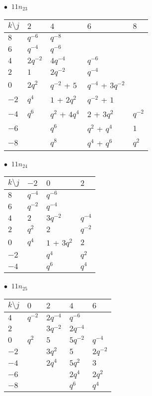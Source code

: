 %
\begin{minipage}{\linewidth}
$\bullet\ $ $11n_{23}$ \vspace{0.5em} \\
\begin{tabular}{l|llll}
$k \setminus j$ & $2$ & $4$ & $6$ & $8$ \\
\hline
$8$ & $q^{-6}$ & $q^{-8}$ &  &  \\
$6$ & $q^{-4}$ & $q^{-6}$ &  &  \\
$4$ & $2q^{-2}$ & $4q^{-4}$ & $q^{-6}$ &  \\
$2$ & $1$ & $2q^{-2}$ & $q^{-4}$ &  \\
$0$ & $2q^{2}$ & $q^{-2}$ + $5$ & $q^{-4}$ + $3q^{-2}$ &  \\
$-2$ & $q^{4}$ & $1$ + $2q^{2}$ & $q^{-2}$ + $1$ &  \\
$-4$ & $q^{6}$ & $q^{2}$ + $4q^{4}$ & $2$ + $3q^{2}$ & $q^{-2}$ \\
$-6$ &  & $q^{6}$ & $q^{2}$ + $q^{4}$ & $1$ \\
$-8$ &  & $q^{8}$ & $q^{4}$ + $q^{6}$ & $q^{2}$ \\
\end{tabular}
\vspace{2em}
\end{minipage}
%
\begin{minipage}{\linewidth}
$\bullet\ $ $11n_{24}$ \vspace{0.5em} \\
\begin{tabular}{l|lll}
$k \setminus j$ & $-2$ & $0$ & $2$ \\
\hline
$8$ & $q^{-4}$ & $q^{-6}$ &  \\
$6$ & $q^{-2}$ & $q^{-4}$ &  \\
$4$ & $2$ & $3q^{-2}$ & $q^{-4}$ \\
$2$ & $q^{2}$ & $2$ & $q^{-2}$ \\
$0$ & $q^{4}$ & $1$ + $3q^{2}$ & $2$ \\
$-2$ &  & $q^{4}$ & $q^{2}$ \\
$-4$ &  & $q^{6}$ & $q^{4}$ \\
\end{tabular}
\vspace{2em}
\end{minipage}
%
\begin{minipage}{\linewidth}
$\bullet\ $ $11n_{25}$ \vspace{0.5em} \\
\begin{tabular}{l|llll}
$k \setminus j$ & $0$ & $2$ & $4$ & $6$ \\
\hline
$4$ & $q^{-2}$ & $2q^{-4}$ & $q^{-6}$ &  \\
$2$ &  & $3q^{-2}$ & $2q^{-4}$ &  \\
$0$ & $q^{2}$ & $5$ & $5q^{-2}$ & $q^{-4}$ \\
$-2$ &  & $3q^{2}$ & $5$ & $2q^{-2}$ \\
$-4$ &  & $2q^{4}$ & $5q^{2}$ & $3$ \\
$-6$ &  &  & $2q^{4}$ & $2q^{2}$ \\
$-8$ &  &  & $q^{6}$ & $q^{4}$ \\
\end{tabular}
\vspace{2em}
\end{minipage}
